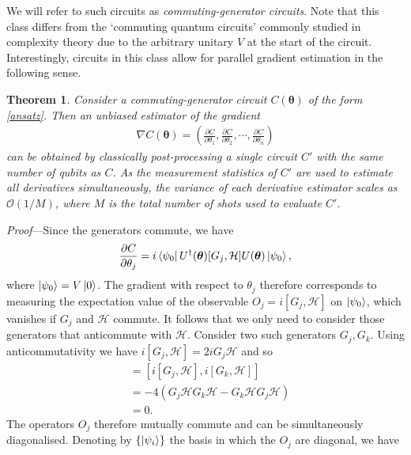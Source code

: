 \documentclass[a4paper,twocolumn,11pt]{quantumarticle}
\newtheorem{theorem}{Theorem}
\renewcommand{\vec}{\boldsymbol}
\begin{document}
We will refer to such circuits as \emph{commuting-generator circuits}. Note that this class differs from the `commuting quantum circuits' \cite{bremner2016average,ni2012commuting} commonly studied in complexity theory due to the arbitrary unitary $V$ at the start of the circuit. Interestingly, circuits in this class allow for parallel gradient estimation in the following sense. 
%
\begin{theorem}\label{thm:grad}
Consider a commuting-generator circuit $C(\vec{\theta})$ of the form \eqref{ansatz}. %
Then an unbiased estimator of the gradient
\begin{align}
    \nabla C(\vec{\theta})=\left(\frac{\partial C}{\partial \theta_1},\frac{\partial C}{\partial \theta_2},\cdots,\frac{\partial C}{\partial \theta_n}\right)
\end{align}
can be obtained by classically post-processing a single circuit $C'$ with the same number of qubits as $C$.
As the measurement statistics of $C'$ are used to estimate all derivatives simultaneously, the variance of each derivative estimator scales as $\mathcal{O}(1/M)$, where $M$ is the total number of shots used to evaluate $C'$.
\end{theorem}
%
\emph{Proof}---Since the generators commute, we have 
%
\begin{align}\label{thegrad}
    \frac{\partial C}{\partial \theta_j}= i \bra{\psi_0} U^{\dagger}(\vec{\theta})[G_j,\mathcal{H}]U(\vec{\theta})\ket{\psi_0},
\end{align}
%
where $\ket{\psi_0}=V\ket{0}$. The gradient with respect to $\theta_j$ therefore corresponds to measuring the expectation value of the observable $O_j=i[G_j,\mathcal{H}]$ on $\ket{\psi_0}$, which vanishes if $G_j$ and $\mathcal{H}$ commute. It follows that we only need to consider those generators that anticommute with $\mathcal{H}$. Consider two such generators $G_j, G_k$. Using anticommutativity we have $i[G_j,\mathcal{H}] = 2iG_j\mathcal{H}$ and so
%
\begin{align}
    [O_j,O_k] &= [i[G_j,\mathcal{H}],i[G_k,\mathcal{H}]] \nonumber\\
    &=-4(G_j\mathcal{H}G_k\mathcal{H}-G_k\mathcal{H}G_j\mathcal{H}) \nonumber \\
    &=0.
\end{align}
%
The operators $O_j$ therefore mutually commute and can be simultaneously diagonalised. Denoting by $\{\ket{\psi_i}\}$ the basis in which the $O_j$ are diagonal, we have
\end{document}
